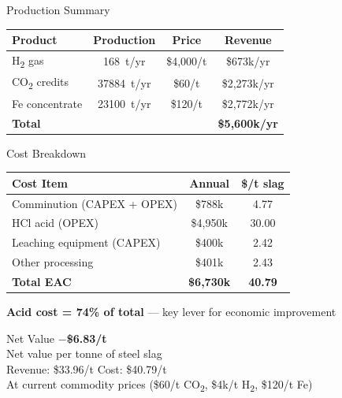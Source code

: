 \documentclass[aspectratio=169]{beamer}
\begin{document}
\begin{frame}{Production Summary}

\centering
\begin{tabular}{lccc}
\toprule
\textbf{Product} & \textbf{Production} & \textbf{Price} & \textbf{Revenue} \\
\midrule
H\textsubscript{2} gas & \SI{168}{t/yr} & \$4,000/t & \$673k/yr \\
CO\textsubscript{2} credits & \SI{37884}{t/yr} & \$60/t & \$2,273k/yr \\
Fe concentrate & \SI{23100}{t/yr} & \$120/t & \$2,772k/yr \\
\midrule
\textbf{Total} & & & \textbf{\$5,600k/yr} \\
\bottomrule
\end{tabular}
\end{frame}

\begin{frame}{Cost Breakdown}

\centering
\begin{tabular}{lcc}
\toprule
\textbf{Cost Item} & \textbf{Annual} & \textbf{\$/t slag} \\
\midrule
Comminution (CAPEX + OPEX) & \$788k & 4.77 \\
HCl acid (OPEX) & \textcolor{StepRed}{\$4,950k} & \textcolor{StepRed}{30.00} \\
Leaching equipment (CAPEX) & \$400k & 2.42 \\
Other processing & \$401k & 2.43 \\
\midrule
\textbf{Total EAC} & \textbf{\$6,730k} & \textbf{40.79} \\
\bottomrule
\end{tabular}

\vspace{8pt}
\textcolor{StepRed}{\textbf{Acid cost = 74\% of total}} --- key lever for economic improvement
\end{frame}

\begin{frame}{Net Value}
\centering
\vspace{1.5cm}
{\Huge\textbf{\textcolor{StepRed}{$-$\$6.83/t}}}\\[12pt]
{\large Net value per tonne of steel slag}\\[8pt]
{\normalsize
\textcolor{StepGreen}{Revenue: \$33.96/t} \quad
\textcolor{StepRed}{Cost: \$40.79/t}}\\[20pt]
{\small At current commodity prices (\$60/t CO\textsubscript{2}, \$4k/t H\textsubscript{2}, \$120/t Fe)}
\end{frame}
\end{document}
